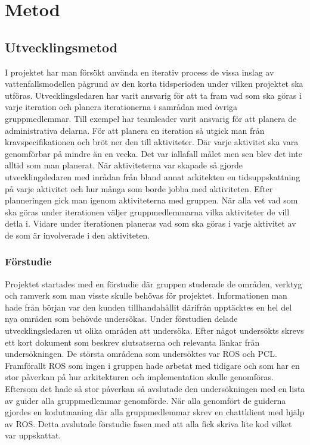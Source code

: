 \chapter{Metod}
\label{cha:method}

\section{Utvecklingsmetod}
I projektet har man försökt använda en iterativ process de vissa inslag av vattenfallsmodellen pågrund av den korta tidsperioden under vilken projektet ska utföras. Utvecklingsledaren har varit ansvarig för att ta fram vad som ska göras i varje iteration och planera iterationerna i samrådan med övriga gruppmedlemmar. Till exempel har teamleader varit ansvarig för att planera de administrativa delarna. För att planera en iteration så utgick man från kravspecifikationen och bröt ner den till aktiviteter. Där varje aktivitet ska vara genomförbar på mindre än en vecka. Det var iallafall målet men sen blev det inte alltid som man planerat. När aktiviteterna var skapade så gjorde utvecklingsledaren med inrådan från bland annat arkitekten en tidsuppskattning på varje aktivitet och hur många som borde jobba med aktiviteten. Efter planneringen gick man igenom aktiviteterna med gruppen. När alla vet vad som ska göras under iterationen väljer gruppmedlemmarna vilka aktiviteter de vill detla i. Vidare under iterationen planeras vad som ska göras i varje aktivitet av de som är involverade i den aktiviteten.

\subsection{Förstudie}
Projektet startades med en förstudie där gruppen studerade de områden, verktyg och ramverk som man visste skulle behövas för projektet. Informationen man hade från början var den kunden tillhandahållit därifrån upptäcktes en hel del nya områden som behövde undersökas. Under förstudien delade utvecklingsledaren ut olika områden att undersöka. Efter något undersökts skrevs ett kort dokument som beskrev slutsatserna och relevanta länkar från undersökningen. De största områdena som undersöktes var ROS och PCL. Framförallt ROS som ingen i gruppen hade arbetat med tidigare och som har en stor påverkan på hur arkitekturen och implementation skulle genomföras. Eftersom det hade så stor påverkan så avslutade den undersökningen med en lista av guider alla gruppmedlemmar genomförde. När alla genomfört de guiderna gjordes en kodutmaning där alla gruppmedlemmar skrev en chattklient med hjälp av ROS. Detta avslutade förstudie fasen med att alla fick skriva lite kod vilket var uppskattat. 

